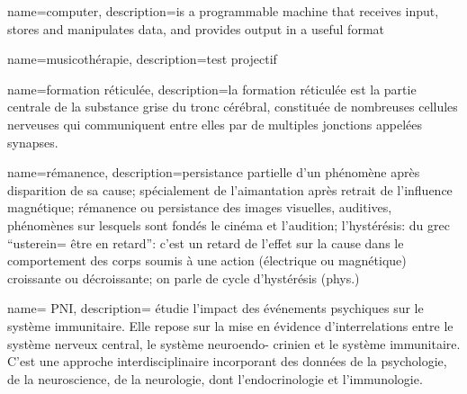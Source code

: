 {
  name=computer,
  description={is a programmable machine that receives input,
               stores and manipulates data, and provides
               output in a useful format}
}

{
  name=musicothérapie,
  description={test projectif}
}


{
  name=formation réticulée,
  description={la formation 
réticulée est la partie centrale de la substance grise du tronc cérébral, 
constituée de nombreuses cellules nerveuses qui communiquent entre elles par de 
multiples jonctions appelées synapses.}
}

{
  name=rémanence,
  description={persistance partielle d'un phénomène après disparition
  de sa cause; spécialement de l'aimantation après retrait de
  l'influence magnétique; rémanence ou persistance des images
  visuelles, auditives, phénomènes sur lesquels sont fondés le cinéma
  et l'audition; l'hystérésis: du grec ``usterein= être en retard'':
  c'est un retard de l'effet sur la cause dans le comportement des
  corps soumis à une action (électrique ou magnétique) croissante ou
  décroissante; on parle de cycle d'hystérésis (phys.)}
}
	
 {
 name= PNI,
  description={ étudie l’impact des événements psychiques sur le système immunitaire. Elle repose sur la mise en évidence d’interrelations entre le système nerveux central, le système neuroendo- crinien et le système immunitaire. C’est une approche interdisciplinaire incorporant des données de la psychologie, de la neuroscience, de la neurologie, dont l’endocrinologie et l’immunologie.}
}
	